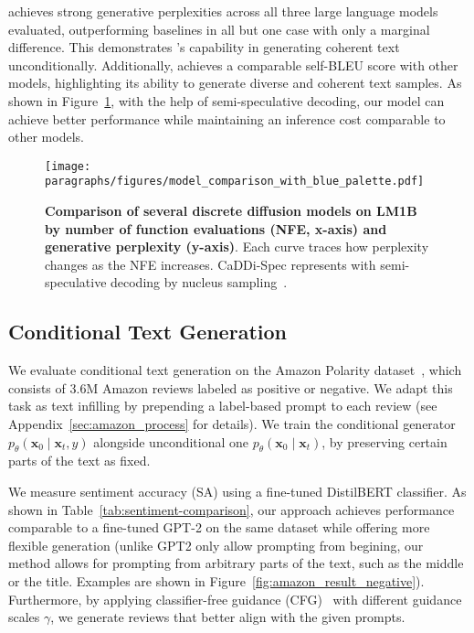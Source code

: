 \method{} achieves strong generative perplexities across all three large language models evaluated, outperforming baselines in all but one case with only a marginal difference. This demonstrates \method{}'s capability in generating coherent text unconditionally. Additionally, \method{} achieves a comparable self-BLEU score with other models, highlighting its ability to generate diverse and coherent text samples. As shown in Figure~\ref{fig:NFE}, with the help of semi-speculative decoding, our model can achieve better performance while maintaining an inference cost comparable to other models. 

\begin{figure}[h]
    \centering
    \texttt{[image: paragraphs/figures/model\_comparison\_with\_blue\_palette.pdf]}
    \vspace{-10pt}
    \caption{\textbf{Comparison of several discrete diffusion models on LM1B by number of function evaluations (NFE, x-axis) and generative perplexity (y-axis)}. Each curve traces how perplexity changes as the NFE increases. CaDDi-Spec represents \method{} with semi-speculative decoding by nucleus sampling~\citep{leviathan2023fast}.
    }
    \label{fig:NFE}
    \vspace{-10pt}
\end{figure}



\subsection{Conditional Text Generation}
We evaluate conditional text generation on the Amazon Polarity dataset~\citep{mcauley2013hidden}, which consists of 3.6M Amazon reviews labeled as positive or negative. We adapt this task as text infilling by prepending a label-based prompt to each review (see Appendix~\ref{sec:amazon_process} for details). We train the conditional generator \(p_\theta\left(\mathbf{x}_0 \mid \mathbf{x}_t, y\right)\) alongside unconditional one  \(p_\theta\left(\mathbf{x}_0 \mid \mathbf{x}_t\right)\), by preserving certain parts of the text as fixed.

We measure sentiment accuracy (SA) using a fine-tuned DistilBERT classifier. As shown in Table~\ref{tab:sentiment-comparison}, our approach achieves performance comparable to a fine-tuned GPT-2 on the same dataset while offering more flexible generation (unlike GPT2 only allow prompting from begining, our method allows for prompting from arbitrary parts of the text, such as the middle or the title. Examples are shown in Figure~\ref{fig:amazon_result_negative}). Furthermore, by applying classifier-free guidance (CFG)~\citep{ho2022classifier} with different guidance scales \(\gamma\), we generate reviews that better align with the given prompts.
\vspace{-5pt}



